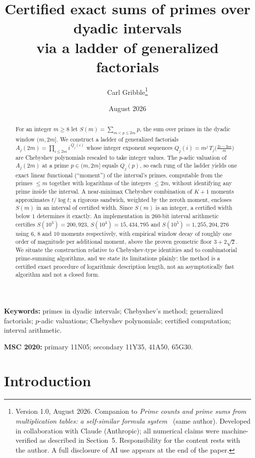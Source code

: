 \documentclass[11pt]{article}
\title{Certified exact sums of primes over dyadic intervals\\ via a ladder of generalized factorials}
\author{Carl Gribble\thanks{Version 1.0, August 2026. Companion to \emph{Prime counts and prime sums from multiplication tables: a
self-similar formula system}~\cite{Companion} (same author). Developed in collaboration with Claude
(Anthropic); all numerical claims were machine-verified as described in Section~5. Responsibility for the content rests with the author.
A full disclosure of AI use appears at the end of the paper.}}
\date{August 2026}
\theoremstyle{remark}
\begin{document}
\maketitle

\begin{abstract}
For an integer $m \ge 8$ let $S(m) = \sum_{m < p \le 2m} p$, the sum over primes in the dyadic window
$(m, 2m]$. We construct a ladder of generalized factorials
$A_j(2m) = \prod_{i \le 2m} i^{\,Q_j(i)}$ whose integer exponent sequences
$Q_j(i) = m^j\,T_j\!\big(\tfrac{2i-3m}{m}\big)$ are Chebyshev polynomials rescaled to take integer values.
The $p$-adic valuation of $A_j(2m)$ at a prime $p \in (m,2m]$ equals $Q_j(p)$, so each rung of the ladder
yields one exact linear functional (``moment'') of the interval's primes, computable from the primes
$\le m$ together with logarithms of the integers $\le 2m$, without identifying any prime inside the
interval. A near-minimax Chebyshev combination of $K{+}1$ moments approximates $t/\log t$; a rigorous
sandwich, weighted by the zeroth moment, encloses $S(m)$ in an interval of certified width. Since $S(m)$
is an integer, a certified width below $1$ determines it exactly. An implementation in $260$-bit interval
arithmetic certifies $S(10^3) = 200{,}923$, $S(10^4) = 15{,}434{,}795$ and
$S(10^5) = 1{,}255{,}204{,}276$ using $6$, $8$ and $10$ moments respectively, with empirical window decay
of roughly one order of magnitude per additional moment, above the proven geometric floor $3 + 2\sqrt{2}$.
We situate the construction relative to Chebyshev-type identities and to combinatorial prime-summing
algorithms, and we state its limitations plainly: the method is a certified exact procedure of
logarithmic description length, not an asymptotically fast algorithm and not a closed form.
\end{abstract}

\medskip
\noindent\textbf{Keywords:} primes in dyadic intervals; Chebyshev's method; generalized factorials;
$p$-adic valuations; Chebyshev polynomials; certified computation; interval arithmetic.

\smallskip
\noindent\textbf{MSC 2020:} primary 11N05; secondary 11Y35, 41A50, 65G30.

\section{Introduction}
\end{document}
